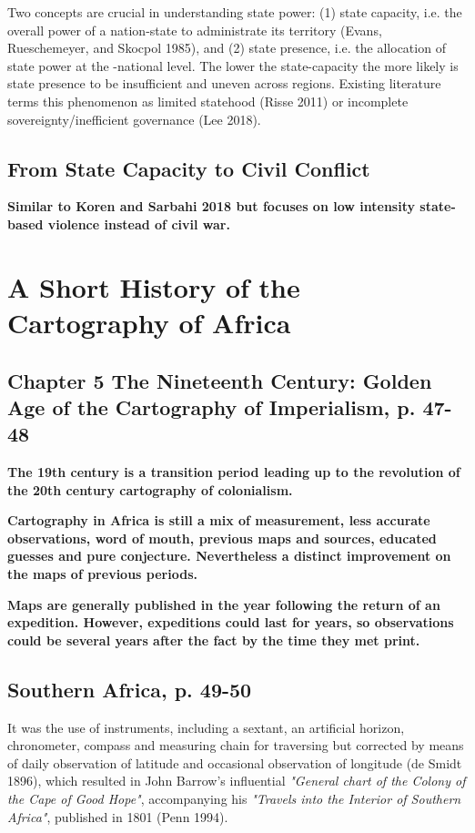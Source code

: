 \documentclass[12pt]{article}
\begin{document}
Two concepts are crucial in understanding state power: (1) state capacity, i.e.
the overall power of a nation-state to administrate its territory (Evans,
Rueschemeyer, and Skocpol 1985), and (2) state presence, i.e. the allocation of
state power at the -national level. The lower the state-capacity the more
likely is state presence to be insufficient and uneven across regions. Existing
literature terms this phenomenon as limited statehood (Risse 2011) or
incomplete sovereignty/inefficient governance (Lee 2018).

\subsection{From State Capacity to Civil Conflict}

\textbf{Similar to Koren and Sarbahi 2018 but focuses on low intensity state-based
violence instead of civil war.}

\section{A Short History of the Cartography of Africa \citep{Stone1995}}

\subsection{Chapter 5 The Nineteenth Century: Golden Age of the Cartography of
Imperialism, p. 47-48 }

\textbf{The 19th century is a transition period leading up to the revolution
of the 20th  century cartography of colonialism.}

\textbf{Cartography in Africa is still a mix of measurement, less accurate
observations, word of mouth,  previous maps and sources, educated guesses and
pure conjecture.  Nevertheless a distinct improvement on the maps of previous
periods.}

\textbf{Maps are generally published in the year following the return of an
expedition.  However, expeditions could last for years, so observations could be
several years after the fact by the time they met print.}

\subsection{Southern Africa, p. 49-50}

It was the use of instruments, including a sextant, an artificial horizon,
chronometer, compass and measuring chain for traversing but corrected by means
of daily observation of latitude and occasional observation of longitude (de
Smidt 1896), which resulted in John Barrow's influential 
\textit{"General chart of the Colony of the Cape of Good Hope"}, accompanying
his \textit{"Travels into the Interior of Southern Africa"}, published in 1801
(Penn 1994).
\end{document}
